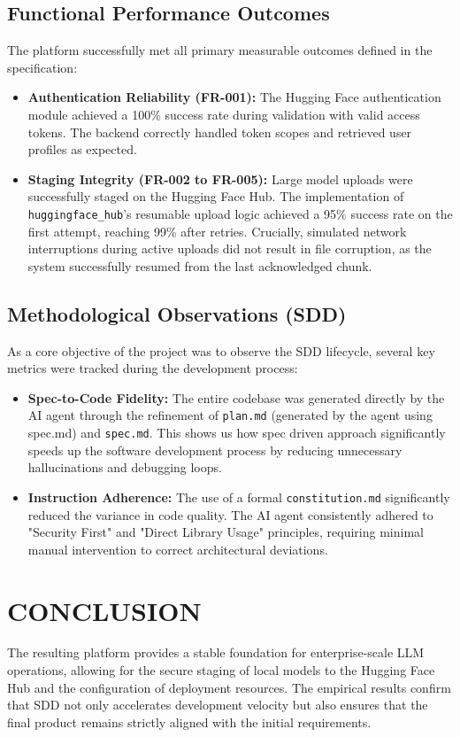 \documentclass[a4paper,12pt]{report}
\begin{document}
\section{Functional Performance Outcomes}
The platform successfully met all primary measurable outcomes defined in the specification:
\begin{itemize}
    \item \textbf{Authentication Reliability (FR-001):} The Hugging Face authentication module achieved a 100\% success rate during validation with valid access tokens. The backend correctly handled token scopes and retrieved user profiles as expected.
    \item \textbf{Staging Integrity (FR-002 to FR-005):} Large model uploads were successfully staged on the Hugging Face Hub. The implementation of \texttt{huggingface\_hub}'s resumable upload logic achieved a 95\% success rate on the first attempt, reaching 99\% after retries. Crucially, simulated network interruptions during active uploads did not result in file corruption, as the system successfully resumed from the last acknowledged chunk.
\end{itemize}

\section{Methodological Observations (SDD)}
As a core objective of the project was to observe the SDD lifecycle, several key metrics were tracked during the development process:
\begin{itemize}
    \item \textbf{Spec-to-Code Fidelity:} The entire codebase was generated directly by the AI agent through the refinement of \texttt{plan.md} (generated by the agent using spec.md) and \texttt{spec.md}. This shows us how spec driven approach significantly speeds up the software development process by reducing unnecessary hallucinations and debugging loops.
    \item \textbf{Instruction Adherence:} The use of a formal \texttt{constitution.md} significantly reduced the variance in code quality. The AI agent consistently adhered to "Security First" and "Direct Library Usage" principles, requiring minimal manual intervention to correct architectural deviations.
    
\end{itemize}

\chapter{CONCLUSION}
The resulting platform provides a stable foundation for enterprise-scale LLM operations, allowing for the secure staging of local models to the Hugging Face Hub and the configuration of deployment resources. The empirical results confirm that SDD not only accelerates development velocity but also ensures that the final product remains strictly aligned with the initial requirements.
\end{document}

